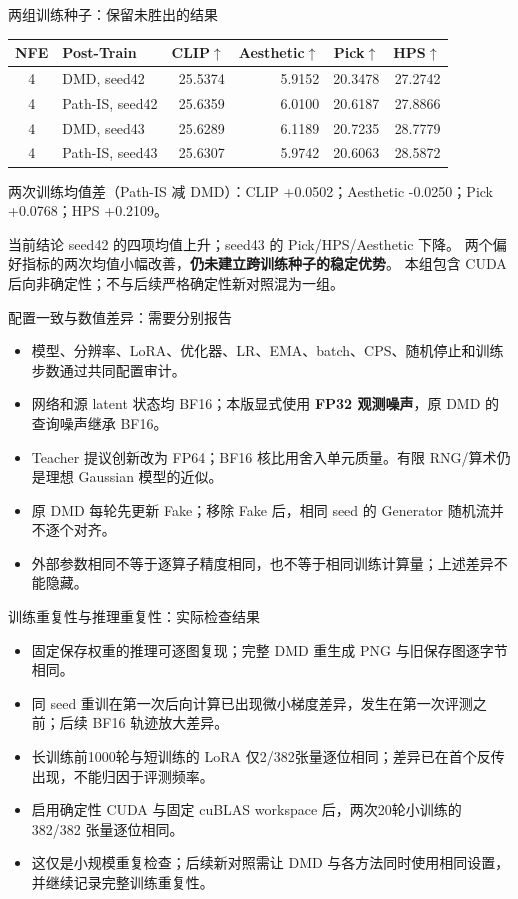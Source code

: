 \documentclass[10pt,aspectratio=169]{beamer}
\begin{document}
\begin{frame}{两组训练种子：保留未胜出的结果}
\small\centering
\begin{tabular}{clrrrr}\toprule
NFE & Post-Train & CLIP$\uparrow$ & Aesthetic$\uparrow$ & Pick$\uparrow$ & HPS$\uparrow$\\\midrule
4 & DMD, seed42 & 25.5374 & 5.9152 & 20.3478 & 27.2742 \\
4 & Path-IS, seed42 & 25.6359 & 6.0100 & 20.6187 & 27.8866 \\
4 & DMD, seed43 & 25.6289 & 6.1189 & 20.7235 & 28.7779 \\
4 & Path-IS, seed43 & 25.6307 & 5.9742 & 20.6063 & 28.5872 \\
\bottomrule\end{tabular}\par\raggedright\vspace{5pt}
两次训练均值差（Path-IS 减 DMD）：CLIP +0.0502；Aesthetic -0.0250；Pick +0.0768；HPS +0.2109。
\begin{alertblock}{当前结论}
seed42 的四项均值上升；seed43 的 Pick/HPS/Aesthetic 下降。
两个偏好指标的两次均值小幅改善，\textbf{仍未建立跨训练种子的稳定优势}。
本组包含 CUDA 后向非确定性；不与后续严格确定性新对照混为一组。
\end{alertblock}
\end{frame}
\begin{frame}{配置一致与数值差异：需要分别报告}
\small
\begin{itemize}\itemsep5pt
\item 模型、分辨率、LoRA、优化器、LR、EMA、batch、CPS、随机停止和训练步数通过共同配置审计。
\item 网络和源 latent 状态均 BF16；本版显式使用 \textbf{FP32 观测噪声}，原 DMD 的查询噪声继承 BF16。
\item Teacher 提议创新改为 FP64；BF16 核比用舍入单元质量。有限 RNG/算术仍是理想 Gaussian 模型的近似。
\item 原 DMD 每轮先更新 Fake；移除 Fake 后，相同 seed 的 Generator 随机流并不逐个对齐。
\item 外部参数相同不等于逐算子精度相同，也不等于相同训练计算量；上述差异不能隐藏。
\end{itemize}
\end{frame}
\begin{frame}{训练重复性与推理重复性：实际检查结果}
\small
\begin{itemize}\itemsep6pt
\item 固定保存权重的推理可逐图复现；完整 DMD 重生成 PNG 与旧保存图逐字节相同。
\item 同 seed 重训在第一次后向计算已出现微小梯度差异，发生在第一次评测之前；后续 BF16 轨迹放大差异。
\item 长训练前1000轮与短训练的 LoRA 仅2/382张量逐位相同；差异已在首个反传出现，不能归因于评测频率。
\item 启用确定性 CUDA 与固定 cuBLAS workspace 后，两次20轮小训练的 382/382 张量逐位相同。
\item 这仅是小规模重复检查；后续新对照需让 DMD 与各方法同时使用相同设置，并继续记录完整训练重复性。
\end{itemize}
\end{frame}
\end{document}
